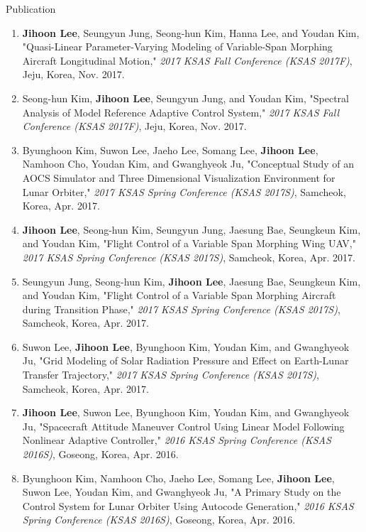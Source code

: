 \documentclass{resume} %
\begin{document}
\begin{rSection}{Publication}
\begin{enumerate}
		\item \textbf{Jihoon Lee}, Seungyun Jung, Seong-hun Kim, Hanna Lee, and Youdan Kim, "Quasi-Linear Parameter-Varying Modeling of Variable-Span Morphing Aircraft Longitudinal Motion," \textit{2017 KSAS Fall Conference (KSAS 2017F)}, Jeju, Korea, Nov. 2017. 
		
		\item Seong-hun Kim, \textbf{Jihoon Lee}, Seungyun Jung, and Youdan Kim, "Spectral Analysis of Model Reference Adaptive Control System," \textit{2017 KSAS Fall Conference (KSAS 2017F)}, Jeju, Korea, Nov. 2017. 
		
		\item Byunghoon Kim, Suwon Lee, Jaeho Lee, Somang Lee, \textbf{Jihoon Lee}, Namhoon Cho, Youdan Kim, and Gwanghyeok Ju, "Conceptual Study of an AOCS Simulator and Three Dimensional Visualization Environment for Lunar Orbiter," \textit{2017 KSAS Spring Conference (KSAS 2017S)}, Samcheok, Korea, Apr. 2017. 
		
		\item \textbf{Jihoon Lee}, Seong-hun Kim, Seungyun Jung, Jaesung Bae, Seungkeun Kim, and Youdan Kim, "Flight Control of a Variable Span Morphing Wing UAV," \textit{2017 KSAS Spring Conference (KSAS 2017S)}, Samcheok, Korea, Apr. 2017. 
		
		\item Seungyun Jung, Seong-hun Kim, \textbf{Jihoon Lee}, Jaesung Bae, Seungkeun Kim, and Youdan Kim, "Flight Control of a Variable Span Morphing Aircraft during Transition Phase," \textit{2017 KSAS Spring Conference (KSAS 2017S)}, Samcheok, Korea, Apr. 2017. 
		
		\item Suwon Lee, \textbf{Jihoon Lee}, Byunghoon Kim, Youdan Kim, and Gwanghyeok Ju, "Grid Modeling of Solar Radiation Pressure and Effect on Earth-Lunar Transfer Trajectory," \textit{2017 KSAS Spring Conference (KSAS 2017S)}, Samcheok, Korea, Apr. 2017. 
		
		\item \textbf{Jihoon Lee}, Suwon Lee, Byunghoon Kim, Youdan Kim, and Gwanghyeok Ju, "Spacecraft Attitude Maneuver Control Using Linear Model Following Nonlinear Adaptive Controller," \textit{2016 KSAS Spring Conference (KSAS 2016S)}, Goseong, Korea, Apr. 2016. 
		
		\item Byunghoon Kim, Namhoon Cho, Jaeho Lee, Somang Lee, \textbf{Jihoon Lee}, Suwon Lee, Youdan Kim, and Gwanghyeok Ju, "A Primary Study on the Control System for Lunar Orbiter Using Autocode Generation," \textit{2016 KSAS Spring Conference (KSAS 2016S)}, Goseong, Korea, Apr. 2016. 
		

\end{enumerate}
\end{rSection}
\end{document}
